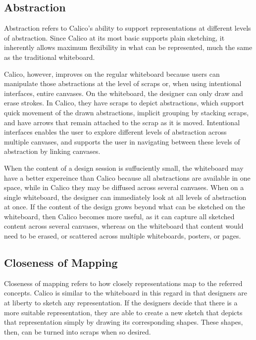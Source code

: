\subsection{Abstraction}
Abstraction refers to Calico's ability to support representations at different levels of abstraction. Since Calico at its most basic supports plain sketching, it inherently allows maximum flexibility in what can be represented, much the same as the traditional whiteboard. 

Calico, however, improves on the regular whiteboard because users can manipulate those abstractions at the level of scraps or, when using intentional interfaces, entire canvases. On the whiteboard, the designer can only draw and erase strokes. In Calico, they have scraps to depict abstractions, which support quick movement of the drawn abstractions, implicit grouping by stacking scraps, and have arrows that remain attached to the scrap as it is moved. Intentional interfaces enables the user to explore different levels of abstraction across multiple canvases, and supports the user in navigating between these levels of abstraction by linking canvases. 

When the content of a design session is suffuciently small, the whiteboard may have a better expereince than Calico because all abstractions are available in one space, while in Calico they may be diffused across several canvases. When on a single whiteboard, the designer can immediately look at all levels of abstraction at once. If the content of the design grows beyond what can be sketched on the whiteboard, then Calico becomes more useful, as it can capture all sketched content across several canvases, whereas on the whiteboard that content would need to be erased, or scattered across multiple whiteboards, posters, or pages. 

\subsection{Closeness of Mapping}


Closeness of mapping refers to how closely representations map to the referred concepts. Calico is similar to the whiteboard in this regard in that designers are at liberty to sketch any representation. If the designers decide that there is a more suitable representation, they are able to create a new sketch that depicts that representation simply by drawing its corresponding shapes. These shapes, then, can be turned into scraps when so desired. 

